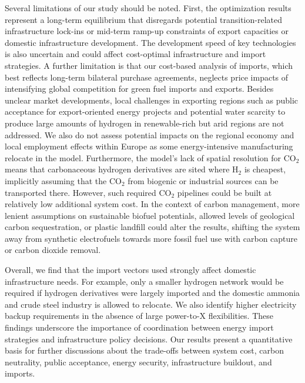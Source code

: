 Several limitations of our study should be noted. First, the optimization
results represent a long-term equilibrium that disregards potential
transition-related infrastructure lock-ins or mid-term ramp-up constraints of
export capacities or domestic infrastructure development. The development speed
of key technologies is also uncertain and could affect cost-optimal
infrastructure and import strategies. A further limitation is that our
cost-based analysis of imports, which best reflects long-term bilateral purchase
agreements, neglects price impacts of intensifying global competition for green
fuel imports and exports.\cite{galimovaGlobalTrading2023a} Besides unclear
market developments, local challenges in exporting regions such as public
acceptance for export-oriented energy projects\cite{ishmamMappingLocalGreen2024}
and potential water
scarcity\cite{franzmannGreenHydrogenCostpotentials2023,terlouwFutureHydrogenEconomies2024}
to produce large amounts of hydrogen in renewable-rich but arid regions are not
addressed. We also do not assess potential impacts on the regional economy and
local employment effects within Europe as some energy-intensive manufacturing
relocate in the model. Furthermore, the model's lack of spatial resolution for
CO$_2$ means that carbonaceous hydrogen derivatives are sited where H$_2$ is
cheapest, implicitly assuming that the CO$_2$ from biogenic or industrial
sources can be transported there. However, such required CO$_2$ pipelines could
be built at relatively low additional system cost.\cite{hofmannH2CO2Network2024}
In the context of carbon management, more lenient assumptions on sustainable
biofuel potentials, allowed levels of geological carbon sequestration, or
plastic landfill could alter the results, shifting the system away from
synthetic electrofuels towards more fossil fuel use with carbon capture or
carbon dioxide
removal.\cite{hofmannH2CO2Network2024,millingerDiversityBiomassUsage2023}

Overall, we find that the import vectors used strongly affect domestic
infrastructure needs. For example, only a smaller hydrogen network would be
required if hydrogen derivatives were largely imported and the domestic ammonia
and crude steel industry is allowed to relocate. We also identify higher electricity
backup requirements in the absence of large power-to-X flexibilities. These
findings underscore the importance of coordination between energy import
strategies and infrastructure policy decisions. Our results present a
quantitative basis for further discussions about the trade-offs between system
cost, carbon neutrality, public acceptance, energy security, infrastructure
buildout, and imports.

